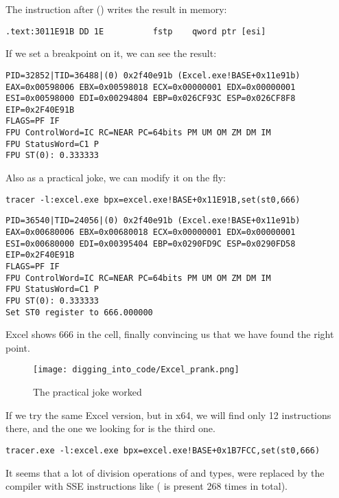 The instruction after \FDIV () writes the result in memory:\\

\begin{lstlisting}[style=customasmx86]
.text:3011E91B DD 1E          fstp    qword ptr [esi]
\end{lstlisting}

If we set a breakpoint on it, we can see the result:

\begin{lstlisting}
PID=32852|TID=36488|(0) 0x2f40e91b (Excel.exe!BASE+0x11e91b)
EAX=0x00598006 EBX=0x00598018 ECX=0x00000001 EDX=0x00000001
ESI=0x00598000 EDI=0x00294804 EBP=0x026CF93C ESP=0x026CF8F8
EIP=0x2F40E91B
FLAGS=PF IF
FPU ControlWord=IC RC=NEAR PC=64bits PM UM OM ZM DM IM 
FPU StatusWord=C1 P 
FPU ST(0): 0.333333
\end{lstlisting}

Also as a practical joke, we can modify it on the fly:

\begin{lstlisting}
tracer -l:excel.exe bpx=excel.exe!BASE+0x11E91B,set(st0,666)
\end{lstlisting}

\begin{lstlisting}
PID=36540|TID=24056|(0) 0x2f40e91b (Excel.exe!BASE+0x11e91b)
EAX=0x00680006 EBX=0x00680018 ECX=0x00000001 EDX=0x00000001
ESI=0x00680000 EDI=0x00395404 EBP=0x0290FD9C ESP=0x0290FD58
EIP=0x2F40E91B
FLAGS=PF IF
FPU ControlWord=IC RC=NEAR PC=64bits PM UM OM ZM DM IM 
FPU StatusWord=C1 P 
FPU ST(0): 0.333333
Set ST0 register to 666.000000
\end{lstlisting}

Excel shows 666 in the cell, finally convincing us that we have found the right point.

\begin{figure}[H]
\centering
\texttt{[image: digging\_into\_code/Excel\_prank.png]}
\caption{The practical joke worked}
\end{figure}

If we try the same Excel version, but in x64,
we will find only 12 \FDIV instructions there,
and the one we looking for is the third one.

\begin{lstlisting}
tracer.exe -l:excel.exe bpx=excel.exe!BASE+0x1B7FCC,set(st0,666)
\end{lstlisting}


It seems that a lot of division operations of \Tfloat and \Tdouble types, were replaced by the compiler with SSE instructions
like  ( is present 268 times in total).

